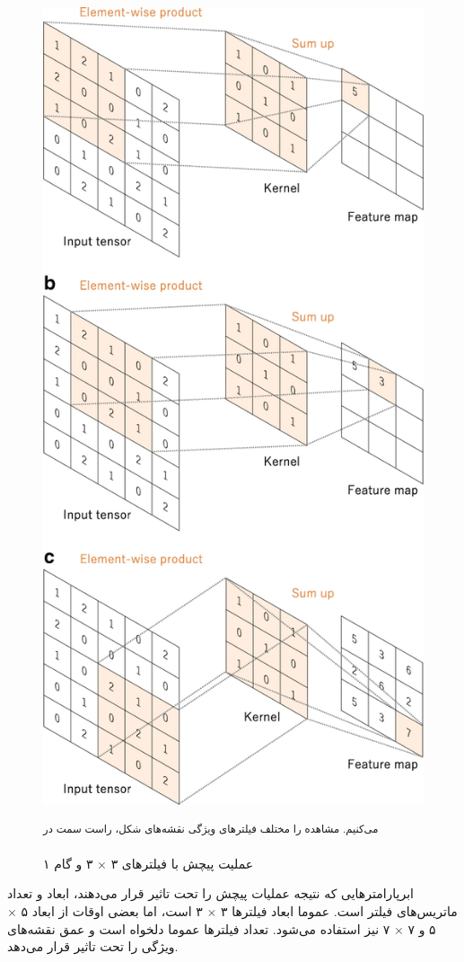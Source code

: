\begin{figure}[h!]
\begin{minipage}{0.5\textwidth}
        \centering
        \includegraphics[width=0.9\linewidth]{figures/Convolution_Procedure.png}
    \end{minipage}
    \begin{center}
        \caption{عملیت پیچش با فیلترهای ۳ $\times$ ۳ و گام‌ ۱ \cite{yamashita2018convolutional}}
        \small\textsuperscript{می‌کنیم. مشاهده را مختلف فیلترهای ویژگی نقشه‌های شکل،  راست سمت در}
    \end{center}
    \label{fig:convolution_procedure}
\end{figure} ابرپارامتر‌هایی که نتیجه عملیات پیچش را تحت تاثیر قرار می‌دهند، ابعاد و تعداد ماتریس‌های فیلتر است. عموما ابعاد فیلترها ۳ $\times$ ۳ است، اما بعضی اوقات از ابعاد ۵ $\times$ ۵ و ۷ $\times$ ۷ نیز استفاده می‌شود. تعداد فیلترها عموما دلخواه است و عمق نقشه‌های ویژگی را تحت تاثیر قرار می‌دهد.

